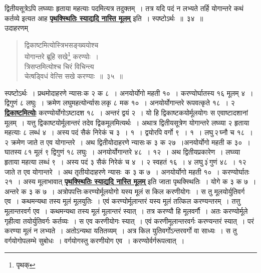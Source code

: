 \documentclass[11pt, openany]{book}
\begin{document}
{{\noindent द्वितीयसूत्रेऽपि लघ्व्याः हृताया महत्याः पदमित्यत्र तदुक्तम्~। तत्र यदि
पदं न लभ्यते तर्हि योगान्तरे कथं कर्तव्ये इत्यत आह \hyperref[34]{\textbf{पृथक्स्थितिः स्याद्यदि नास्ति मूलम्}} इति~। स्पष्टोऽर्थः~॥~३४~॥\\

\vspace{-2mm}
{\bqt उदाहरणम्\textendash }

 \label{35}
\begin{quote}
    {\eg 
    द्विकाष्टमित्योस्त्रिभसङ्ख्ययोश्च \\
    योगान्तरे ब्रूहि सखे\footnote{पृथक्} करण्योः~।\\
त्रिसप्तमित्योश्च चिरं विचिन्त्य \\
चेत्षड्विधं वेत्सि सखे करण्याः~॥~३५~॥}
\end{quote}

 स्पष्टोऽर्थः~। प्रथमोदाहरणे न्यासः\textendash \,क २ क ८~। अनयोर्योगो महती १०~। करण्योर्घातस्य १६ मूलम् ४~। द्विगुणं ८ लघुः~। क्रमेण
लघुमहत्योर्न्यासः\textendash \,लकृ ८ मक १०~। अनयोर्योगान्तरे रूपवत्कृते १८~। २ \hyperref[35]{\textbf{द्विकाष्टमित्योः}}
करण्योर्योगोऽष्टादश १८~। अन्तरं द्वयं २~। यो हि द्विकाष्टकयोर्मूलयोगः स एवाष्टादशानां मूलम्~। यत्तु द्विकाष्टयोर्मूलान्तरं तदेव द्विकमूलमित्यर्थः~।
अथात्र द्वितीयसूत्रेण योगान्तरे लघ्व्या २ हृताया महत्याः ८ लब्धं ४~। अस्य पदं सैकं निरेकं च 
३~। १~। द्वयोरपि वर्गो ९~। १~। लघु\textendash \,२\textendash \,घ्नौ च १८~। २ क्रमेण जाते त 
एव योगान्तरे~। अथ द्वितीयोदाहरणे न्यासः\textendash \,क ३ क २७~।अनयोर्योगो महती 
क ३०~। घातस्य ८१ मूलं ९ द्विगुणं १८ लघुः~। अनयोर्योगान्तरे ४८~। 
१२~। अथ द्वितीयप्रकारेण~। लघ्व्या हृताया महत्या लब्धं ९~। अस्य पदं ३
सैकं निरेकं च ४~। २ स्वहतं १६~। ४ लघु\textendash \,३ं\textendash \,गुणं ४८~। १२ जाते त एव 
योगान्तरे~। अथ तृतीयोदाहरणे न्यासः\textendash\ क ३ क ७~। अनयोर्योगो महती १०~। 
करण्योर्घातः २१~। अस्य मूलाभावात् \hyperref[34]{\textbf{पृथक्स्थितिः स्याद्यदि नास्ति मूलम्}} इति जाता पृथक्स्थितिः~। योगे क ३ क ७~। अन्तरे क ३ क ७~। अत्रोपपत्तिः\textendash \,करण्योर्मूलयोगो यस्य मूलं स किल करणीयोगः~। स तु मूलयोर्युतिवर्ग एव~।
\newpage 
\noindent कथमन्यथा तस्य मूलं मूलयुतिः~। एवं करण्योर्मूलान्तरं यस्य मूलं तत्किल
करण्यन्तरम्~। तत्तु मूलान्तरवर्ग एव~। कथमन्यथा तस्य मूलं मूलान्तरं स्यात्~।
तत्र करण्यौ हि मूलवर्गौ~। अतः करण्योर्मूले गृहीत्वा तयोर्युतिवर्गः कर्तव्यः~।
स एव करणीयोगः स्यात्~। एवं करणीमूलान्तरवर्गः करण्यन्तरं स्यात्~। परं करण्या
मूलं न लभ्यते~। अतोऽन्यथा यतितव्यम्~। अत्र किल युतिवर्गोऽन्तरवर्गो वा
साध्यः~। स तु वर्गयोगोपलम्भे सुबोधः~। वर्गयोगस्तु करणीयोग एव~।
करण्योर्वर्गरूपत्वात्~।\\

}}
\end{document}

